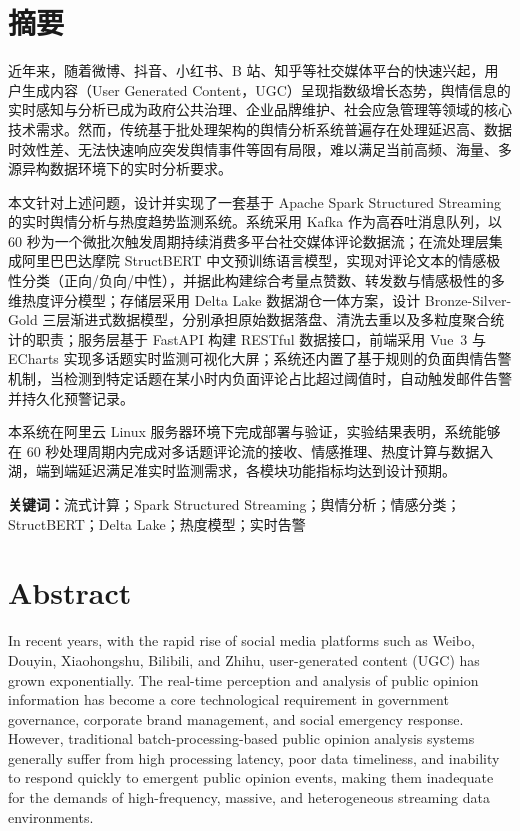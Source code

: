 
\chapter*{摘\quad 要}

近年来，随着微博、抖音、小红书、B 站、知乎等社交媒体平台的快速兴起，用户生成内容（User Generated Content，UGC）呈现指数级增长态势，舆情信息的实时感知与分析已成为政府公共治理、企业品牌维护、社会应急管理等领域的核心技术需求。然而，传统基于批处理架构的舆情分析系统普遍存在处理延迟高、数据时效性差、无法快速响应突发舆情事件等固有局限，难以满足当前高频、海量、多源异构数据环境下的实时分析要求。

本文针对上述问题，设计并实现了一套基于 Apache Spark Structured Streaming 的实时舆情分析与热度趋势监测系统。系统采用 Kafka 作为高吞吐消息队列，以 60 秒为一个微批次触发周期持续消费多平台社交媒体评论数据流；在流处理层集成阿里巴巴达摩院 StructBERT 中文预训练语言模型，实现对评论文本的情感极性分类（正向/负向/中性），并据此构建综合考量点赞数、转发数与情感极性的多维热度评分模型；存储层采用 Delta Lake 数据湖仓一体方案，设计 Bronze-Silver-Gold 三层渐进式数据模型，分别承担原始数据落盘、清洗去重以及多粒度聚合统计的职责；服务层基于 FastAPI 构建 RESTful 数据接口，前端采用 Vue~3 与 ECharts 实现多话题实时监测可视化大屏；系统还内置了基于规则的负面舆情告警机制，当检测到特定话题在某小时内负面评论占比超过阈值时，自动触发邮件告警并持久化预警记录。

本系统在阿里云 Linux 服务器环境下完成部署与验证，实验结果表明，系统能够在 60 秒处理周期内完成对多话题评论流的接收、情感推理、热度计算与数据入湖，端到端延迟满足准实时监测需求，各模块功能指标均达到设计预期。

\vspace{1em}
\noindent\textbf{关键词：}流式计算；Spark Structured Streaming；舆情分析；情感分类；StructBERT；Delta Lake；热度模型；实时告警

\clearpage

\chapter*{Abstract}

In recent years, with the rapid rise of social media platforms such as Weibo, Douyin, Xiaohongshu, Bilibili, and Zhihu, user-generated content (UGC) has grown exponentially. The real-time perception and analysis of public opinion information has become a core technological requirement in government governance, corporate brand management, and social emergency response. However, traditional batch-processing-based public opinion analysis systems generally suffer from high processing latency, poor data timeliness, and inability to respond quickly to emergent public opinion events, making them inadequate for the demands of high-frequency, massive, and heterogeneous streaming data environments.

